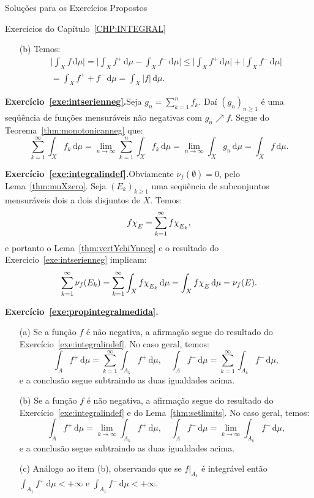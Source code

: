 \documentclass[oneside,final,11pt]{amsbook}
\newcommand{\dd}{\mathrm d}
\newcommand{\chilow}[1]{\chi_{\lower2pt\hbox{$\scriptstyle#1$}}}
\theoremstyle{remark}\newtheorem{exercise}{Exercício}[chapter]
\theoremstyle{remark}\newtheorem{*exercise}[exercise]{\hbox to 0pt{\hskip 0pt minus 1fil*}Exercício}
\theoremstyle{definition}\newtheorem{exdefin}{Definição}[chapter]
\theoremstyle{plain}\newtheorem{teo}{Teorema}[section]
\theoremstyle{plain}\newtheorem{lem}[teo]{Lema}
\theoremstyle{plain}\newtheorem{prop}[teo]{Proposição}
\theoremstyle{plain}\newtheorem{cor}[teo]{Corolário}
\theoremstyle{definition}\newtheorem{defin}[teo]{Definição}
\theoremstyle{remark}\newtheorem{rem}[teo]{Observação}
\theoremstyle{definition}\newtheorem{notation}[teo]{Notação}
\theoremstyle{definition}\newtheorem{convention}[teo]{Convenção}
\theoremstyle{definition}\newtheorem{example}[teo]{Exemplo}
\numberwithin{section}{chapter}
\numberwithin{equation}{section}
\begin{document}
\begin{chapter}{Soluções para os Exercícios Propostos}
\begin{section}{Exercícios do Capítulo~\ref{CHP:INTEGRAL}}
\begin{itemize}
\smallskip

\item[(b)] Temos:
\begin{multline*}
\Big\vert\int_Xf\,\dd\mu\Big\vert=\Big\vert\int_Xf^+\,\dd\mu-\int_Xf^-\,\dd\mu\Big\vert
\le\Big\vert\int_Xf^+\,\dd\mu\Big\vert+\Big\vert\int_Xf^-\,\dd\mu\Big\vert\\
=\int_Xf^++f^-\,\dd\mu=\int_X\vert f\vert\,\dd\mu.
\end{multline*}
\end{itemize}

\medskip

\textbf{Exercício~\ref{exe:intserienneg}.}\enspace Seja $g_n=\sum_{k=1}^nf_k$. Daí
$(g_n)_{n\ge1}$ é uma seqüência de funções mensuráveis não negativas com $g_n\nearrow f$.
Segue do Teorema~\ref{thm:monotonicanneg} que:
\[\sum_{k=1}^\infty\int_Xf_k\,\dd\mu=\lim_{n\to\infty}\sum_{k=1}^n\int_Xf_k\,\dd\mu
=\lim_{n\to\infty}\int_Xg_n\,\dd\mu=\int_Xf\,\dd\mu.\]

\medskip

\textbf{Exercício~\ref{exe:integralindef}.}\enspace Obviamente $\nu_f(\emptyset)=0$,
pelo Lema~\ref{thm:muXzero}. Seja $(E_k)_{k\ge1}$ uma seqüência de subconjuntos mensuráveis
dois a dois disjuntos de $X$. Temos:
\[f\chilow E=\sum_{k=1}^\infty f\chilow{E_k},\]
e portanto o Lema~\ref{thm:vertYchiYnneg} e o resultado do Exercício~\ref{exe:intserienneg}
implicam:
\[\sum_{k=1}^\infty\nu_f(E_k)=\sum_{k=1}^\infty\int_Xf\chilow{E_k}\,\dd\mu
=\int_Xf\chilow E\,\dd\mu=\nu_f(E).\]

\medskip

\textbf{Exercício~\ref{exe:propintegralmedida}.}
\begin{itemize}
\item[(a)] Se a função $f$ é não negativa, a afirmação segue do resultado do Exercício~\ref{exe:integralindef}.
No caso geral, temos:
\[\int_Af^+\,\dd\mu=\sum_{k=1}^\infty\int_{A_k}f^+\,\dd\mu,\quad
\int_Af^-\,\dd\mu=\sum_{k=1}^\infty\int_{A_k}f^-\,\dd\mu,\]
e a conclusão segue subtraindo as duas igualdades acima.

\smallskip

\item[(b)] Se a função $f$ é não negativa, a afirmação segue do resultado do Exercício~\ref{exe:integralindef}
e do Lema~\ref{thm:setlimits}. No caso geral, temos:
\[\int_Af^+\,\dd\mu=\lim_{k\to\infty}\int_{A_k}f^+\,\dd\mu,\quad
\int_Af^-\,\dd\mu=\lim_{k\to\infty}\int_{A_k}f^-\,\dd\mu,\]
e a conclusão segue subtraindo as duas igualdades acima.

\smallskip

\item[(c)] Análogo ao item (b), observando que se $f\vert_{A_1}$ é integrável então
$\int_{A_1}f^+\,\dd\mu<+\infty$ e $\int_{A_1}f^-\,\dd\mu<+\infty$.
\end{itemize}

\end{section}

\end{chapter}
\endgroup
\end{document}

